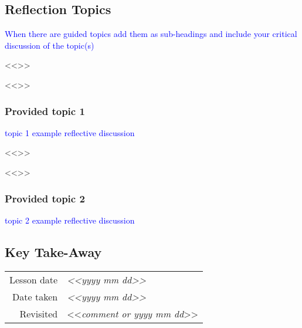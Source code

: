 {%
\subsection{Reflection Topics}

{\textcolor{blue}{When there are guided topics add them as sub-headings and include your critical discussion of the topic(s)}}

<<{\emph{\blindtext[1]}}>> %

<<{\emph{\blindtext[1]}}>> %

\subsubsection{Provided topic 1}

{\textcolor{blue}{topic 1 example reflective discussion}}

<<{\emph{\blindtext[1]}}>> %

<<{\emph{\blindtext[1]}}>> %

\subsubsection{Provided topic 2}

{\textcolor{blue}{topic 2 example reflective discussion}}




\subsection{Key Take-Away}

\begin{table}[H]
    \begin{tabular}{r @{: } p{40mm}}
        Lesson date & {\emph{<<yyyy mm dd>>}} \\
        Date taken & {\emph{<<yyyy mm dd>>}} \\
        Revisited & <<{\emph{comment or yyyy mm dd}}>> \\
    \end{tabular}
\end{table}

}
